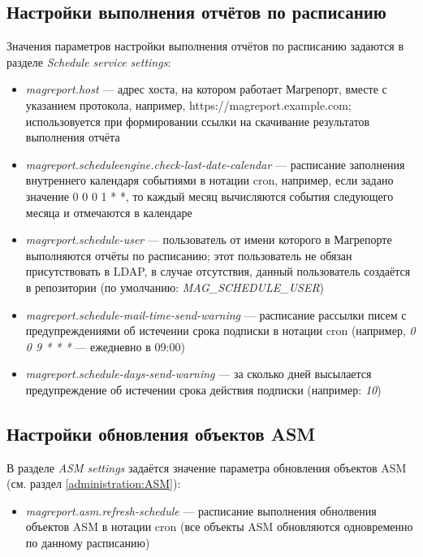 \documentclass[../user-manual.tex]{subfiles}
\begin{document}
	\subsection{Настройки выполнения отчётов по расписанию}
	
	Значения параметров настройки выполнения отчётов по расписанию задаются в разделе \textit{Schedule service settings}:
	
	\begin{itemize}
		\item \textit{magreport.host} --- адрес хоста, на котором работает Магрепорт, вместе с указанием протокола, например, https://magreport.example.com; использовуется при формировании ссылки на скачивание результатов выполнения отчёта
		
		\item \textit{magreport.scheduleengine.check-last-date-calendar} --- расписание заполнения внутреннего календаря событиями в нотации cron, например, если задано значение 0 0 0 1 * *, то каждый месяц вычисляются события следующего месяца и отмечаются в календаре
		
		\item \textit{magreport.schedule-user} --- пользователь от имени которого в Магрепорте выполняются отчёты по расписанию; этот пользователь не обязан присутствовать в LDAP, в случае отсутствия, данный пользователь создаётся в репозитории (по умолчанию: \textit{MAG\_SCHEDULE\_USER})
		
		\item \textit{magreport.schedule-mail-time-send-warning} --- расписание рассылки писем с предупреждениями об истечении срока подписки в нотации cron (например, \textit{0 0 9 * * *} --- ежедневно в 09:00)
		
		\item \textit{magreport.schedule-days-send-warning} --- за сколько дней высылается предупреждение об истечении срока действия подписки (например: \textit{10})
		
	\end{itemize}
	
	\subsection{Настройки обновления объектов ASM}
	
	В разделе \textit{ASM settings} задаётся значение параметра обновления объектов ASM (см. раздел \ref{administration:ASM}):
	
	\begin{itemize}
		\item \textit{magreport.asm.refresh-schedule} --- расписание выполнения обнолвения объектов ASM в нотации cron (все объекты ASM обновляются одновременно по данному расписанию)
	\end{itemize}
	
\end{document}
